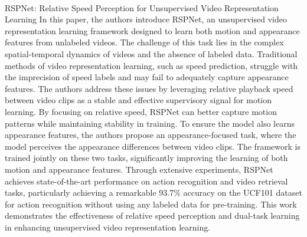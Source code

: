 \documentclass[11pt,a4paper]{report}
\begin{document}
\paragraph{} RSPNet: Relative Speed Perception for Unsupervised Video Representation Learning
In this paper, \cite{Chen2021} the authors introduce RSPNet, an unsupervised video representation learning framework designed to learn both motion and appearance features from unlabeled videos. The challenge of this task lies in the complex spatial-temporal dynamics of videos and the absence of labeled data. Traditional methods of video representation learning, such as speed prediction, struggle with the imprecision of speed labels and may fail to adequately capture appearance features. The authors address these issues by leveraging relative playback speed between video clips as a stable and effective supervisory signal for motion learning. By focusing on relative speed, RSPNet can better capture motion patterns while maintaining stability in training. To ensure the model also learns appearance features, the authors propose an appearance-focused task, where the model perceives the appearance differences between video clips. The framework is trained jointly on these two tasks, significantly improving the learning of both motion and appearance features. Through extensive experiments, RSPNet achieves state-of-the-art performance on action recognition and video retrieval tasks, particularly achieving a remarkable 93.7\% accuracy on the UCF101 dataset for action recognition without using any labeled data for pre-training. This work demonstrates the effectiveness of relative speed perception and dual-task learning in enhancing unsupervised video representation learning.





\end{document}
